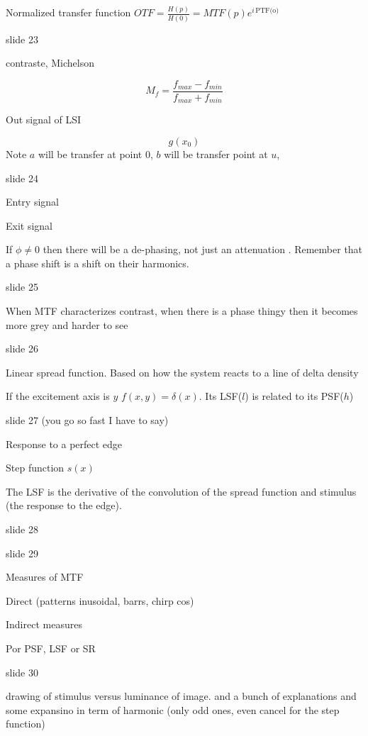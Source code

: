 \documentclass[../main/main.tex]{subfiles}
\begin{document}
Normalized transfer function $OTF = \frac{H(p)}{H(0)} = MTF(p) e^{i\,\textrm{PTF(o)}}$


slide 23

contraste, Michelson

\begin{equation}
M_{f} = \frac{f_{max} - f_{min}}{f_{max} + f_{min}}
\end{equation}

Out signal of LSI

\begin{equation}
g(x_{0})
\end{equation}
Note $a$ will be transfer at point $0$, $b$ will be transfer point at $u$,

slide 24

Entry signal


Exit signal

If $\phi\neq0$ then there will be a de-phasing, not just an attenuation . Remember that a phase shift is a shift on their harmonics.

slide 25

When MTF characterizes contrast, when there is a phase thingy then it becomes more grey and harder to see


slide 26

Linear spread function. Based on how the system reacts to a line of delta density

If the excitement axis is $y$ $f(x, y) = \delta(x)$. Its LSF($l$) is related to its PSF($h$)



slide 27 (you go so fast I have to say)

Response to a perfect edge

Step function $s(x)$

The LSF is the derivative of the convolution of the spread function and stimulus (the response to the edge).

slide 28

slide 29

Measures of MTF

Direct (patterns inusoidal, barrs, chirp cos)

Indirect measures

Por PSF, LSF or SR

slide 30

drawing of stimulus versus luminance of image. and a bunch of explanations and some expansino in term of harmonic (only odd ones, even cancel for the step function)
\end{document}
